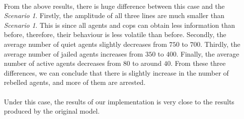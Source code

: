 \documentclass[11pt]{article}
\begin{document}
      \paragraph{}
      From the above results, there is huge difference between this case and 
      the \textit{Scenario 1}. Firstly, the amplitude of all three lines are much
      smaller than \textit{Scenario 1}. This is since all agents and cops can obtain
      less information than before, therefore, their behaviour is less volatile
      than before. Secondly, the average number of quiet agents slightly decreases
      from $750$ to $700$. Thirdly, the average number of jailed agents increases
      from $350$ to $400$. Finally, the average number of active agents decreases
      from $80$ to around $40$.
      From these three differences, we can conclude that there is slightly increase
      in the number of rebelled agents, and more of them are arrested.
      \paragraph{}
      Under this case, the results of our implementation is very close to the results
      produced by the original model.
\end{document}
